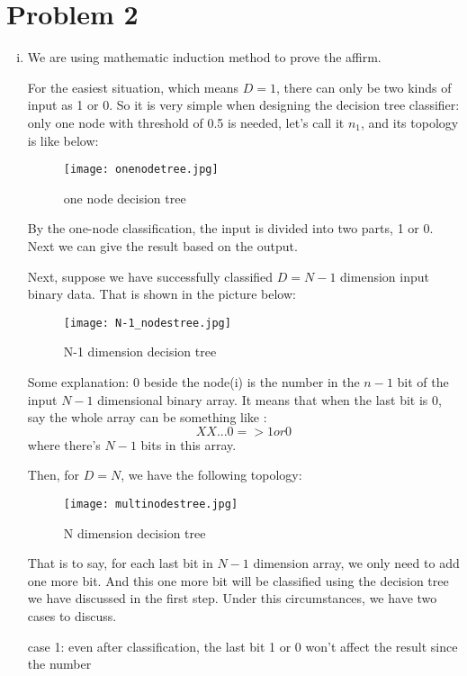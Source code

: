 \documentclass[twoside,11pt]{homework}
\begin{document}
\section*{Problem 2}
\begin{enumerate}[(i)]
\item 
We are using mathematic induction method to prove the affirm.

For the easiest situation, which means $D=1$, there can only be two kinds of input as 1 or 0. So it is very simple when designing the decision tree classifier: only one node  with threshold of 0.5 is needed, let's call it $n_{1}$, and its topology is like below:

\begin{figure}[H]
\centering\texttt{[image: onenodetree.jpg]}
\caption{one node decision tree}
\label{fig:one node decision tree}
\end{figure}

By the one-node classification, the input is divided into two parts, 1 or 0. Next we can give the result based on the output.  

Next, suppose we have successfully classified $D = N-1$ dimension input binary data. That is shown in the picture below:

\begin{figure}[H]
\centering\texttt{[image: N-1\_nodestree.jpg]}
\caption{N-1 dimension decision tree}
\label{fig:N-1 dimension decision tree}
\end{figure}
Some explanation: $0$ beside the node(i) is the number in the $n-1$ bit of the input $N-1$ dimensional binary array. It means that when the last bit is 0, say the whole array can be something like :
$$XX...0=>1 or 0$$
where there's $N-1$ bits in this array. 

Then, for $D=N$, we have the following topology:

\begin{figure}[H]
\centering\texttt{[image: multinodestree.jpg]}
\caption{N dimension decision tree}
\label{fig:N dimension decision tree}
\end{figure}

That is to say, for each last bit in $N-1$ dimension array, we only need to add one more bit.  And this one more bit will be classified using the decision tree we have discussed in the first step.  Under this circumstances, we have two cases to discuss.

case 1: even after classification, the last bit 1 or 0 won't affect the result since the number 


\end{enumerate}
\end{document}
